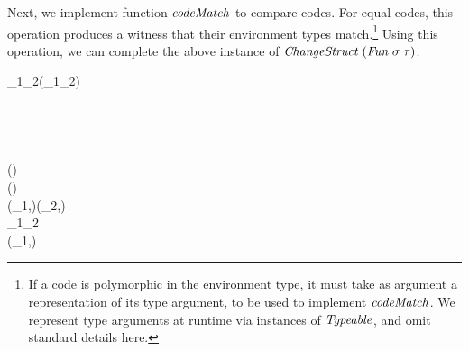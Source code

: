 Next, we implement function \ensuremath{\Varid{codeMatch}} to compare codes. For equal codes, this
operation produces a witness that their environment types match.\footnote{%
If a code is polymorphic in the environment type, it must take as argument a
representation of its type argument, to be used to implement \ensuremath{\Varid{codeMatch}}.
We represent type arguments at runtime via instances of \ensuremath{\Conid{Typeable}}, and omit
standard details here.}
Using this operation, we can complete the above instance of
\ensuremath{\Conid{ChangeStruct}\;(\Conid{Fun}\;\sigma\;\tau)}.

\begin{hscode}\SaveRestoreHook
{}%
%
%
%
%
\>[B]{}\mathrel{:\mkern-1mu:}\;_{1}\;\sigma\;\tau\to {}\;_{2}\;\sigma\;\tau\to {}\;(_{1}\mathrel{:\mkern-1mu\sim\mkern-1mu:}_{2}){}\<[E]%
\\
\>[B]{}\;\;\mathrel{=}\;\<[E]%
\\
\>[B]{}\;\;\mathrel{=}\;\<[E]%
\\
\>[B]{}\;\;\mathrel{=}\;\<[E]%
\\
\>[B]{}\;\text{\textunderscore}\;\text{\textunderscore}\mathrel{=}\<[E]%
\\[\blanklineskip]%
\>[B]{}\;\;(\;\sigma\;\tau)\;\<[E]%
\\
\>[B]{}\<[3]%
\>[3]{}\;\Delta (\;\sigma\;\tau)\mathrel{=}\;\sigma\;\tau{}\<[E]%
\\
\>[B]{}\<[3]%
\>[3]{}\;(_{1},)\oplus {}\;(_{2},)\mathrel{=}{}\<[E]%
\\
\>[3]{}\<[5]%
\>[5]{}\;\;_{1}\;_{2}\;\<[E]%
\\
\>[5]{}\<[7]%
\>[7]{}\;\to {}\;(_{1},\oplus {}){}\<[E]%
\\
\>[5]{}\<[7]%
\>[7]{}\to {}\;\<[E]%
\ColumnHook
\end{hscode}\resethooks


